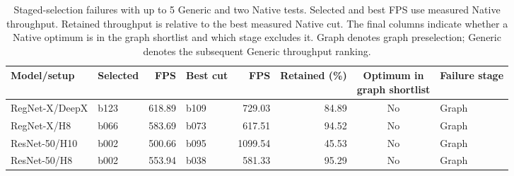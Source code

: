 \begin{table}[t]
\centering\small
\caption{Staged-selection failures with up to 5 Generic and two Native tests. Selected and best FPS use measured Native throughput. Retained throughput is relative to the best measured Native cut. The final columns indicate whether a Native optimum is in the graph shortlist and which stage excludes it. Graph denotes graph preselection; Generic denotes the subsequent Generic throughput ranking.}
\label{tab:staged-failures-5}
\setlength{\tabcolsep}{3pt}
\begin{tabular*}{\textwidth}{@{\extracolsep{\fill}}llrlrrcl@{}}
\toprule
Model/setup & Selected & FPS & Best cut & FPS & Retained (\%) & \shortstack{Optimum in\\graph shortlist} & Failure stage \\
\midrule
RegNet-X/DeepX & b123 & 618.89 & b109 & 729.03 & 84.89 & No & Graph\\
RegNet-X/H8 & b066 & 583.69 & b073 & 617.51 & 94.52 & No & Graph\\
ResNet-50/H10 & b002 & 500.66 & b095 & 1099.54 & 45.53 & No & Graph\\
ResNet-50/H8 & b002 & 553.94 & b038 & 581.33 & 95.29 & No & Graph\\
\bottomrule
\end{tabular*}
\end{table}
